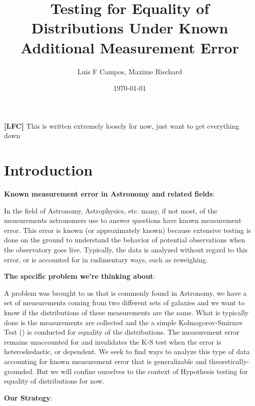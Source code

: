 \documentclass[12pt]{article}
\title{Testing for Equality of Distributions Under Known Additional Measurement Error}
\author{Luis F Campos, Maxime Rischard}
\date{\today}
\newcommand{\lfc}[1]{\textcolor{Lblue}{{\bf[LFC]} #1}}
\begin{document}
\maketitle

\lfc{This is written extremely loosely for now, just want to get everything down}

\section{Introduction} %
\label{sec:introduction}


{\bf{Known measurement error in Astronomy and related fields}}:

In the field of Astronomy, Astrophysics, etc. many, if not most, of the measurements astronomers use to answer questions have known measurement error. This error is known (or approximately known) because extensive testing is done on the ground to understand the behavior of potential observations when the observatory goes live. Typically, the data is analyzed without regard to this error, or is accounted for in rudimentary ways, such as reweighing. 


{\bf{The specific problem we're thinking about}}:

A problem was brought to us that is commonly found in Astronomy, we have a set of measurements coming from two different sets of galaxies and we want to know if the distributions of these measurements are the same. What is typically done is the measurements are collected and the a simple Kolmogorov-Smirnov Test (\cite{smirnov1948}) is conducted for equality of the distributions. The measurement error remains unaccounted for and invalidates the K-S test when the error is heteroskedastic, or dependent. We seek to find ways to analyze this type of data accounting for known measurement error that is generalizable and theoretically-grounded. But we will confine ourselves to the context of Hypothesis testing for equality of distributions for now.


{\bf{Our Strategy}}:
\end{document}
